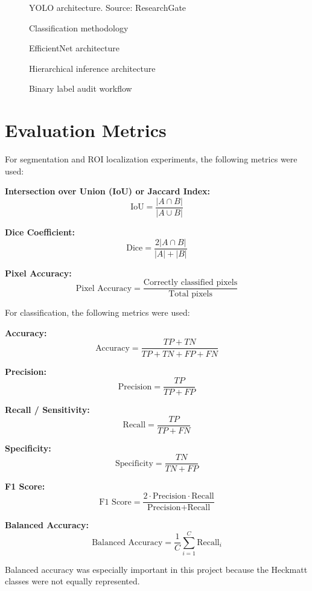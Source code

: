 \begin{figure}[H]
\centering
{}
\caption{YOLO architecture. Source: ResearchGate}
\label{fig:yolo_arch}
\end{figure}

\begin{figure}[H]
\centering
{}
\caption{Classification methodology}
\label{fig:classification_methodology}
\end{figure}

\begin{figure}[H]
\centering
{}
\caption{EfficientNet architecture}
\label{fig:efficientnet_arch}
\end{figure}


\begin{figure}[H]
\centering
{}
\caption{Hierarchical inference architecture}
\label{fig:hierarchical_arch}
\end{figure}

\begin{figure}[H]
\centering
{}
\caption{Binary label audit workflow}
\label{fig:audit_arch}
\end{figure}

\section{Evaluation Metrics}
\label{metrics}
For segmentation and ROI localization experiments, the following metrics were used:

\textbf{Intersection over Union (IoU) or Jaccard Index:}
\[
\text{IoU} = \frac{|A \cap B|}{|A \cup B|}
\]

\textbf{Dice Coefficient:}
\[
\text{Dice} = \frac{2|A \cap B|}{|A| + |B|}
\]

\textbf{Pixel Accuracy:}
\[
\text{Pixel Accuracy} = \frac{\text{Correctly classified pixels}}{\text{Total pixels}}
\]

For classification, the following metrics were used:

\textbf{Accuracy:}
\[
\text{Accuracy} = \frac{TP + TN}{TP + TN + FP + FN}
\]

\textbf{Precision:}
\[
\text{Precision} = \frac{TP}{TP + FP}
\]

\textbf{Recall / Sensitivity:}
\[
\text{Recall} = \frac{TP}{TP + FN}
\]

\textbf{Specificity:}
\[
\text{Specificity} = \frac{TN}{TN + FP}
\]

\textbf{F1 Score:}
\[
\text{F1 Score} = \frac{2 \cdot \text{Precision} \cdot \text{Recall}}{\text{Precision} + \text{Recall}}
\]

\textbf{Balanced Accuracy:}
\[
\text{Balanced Accuracy} = \frac{1}{C}\sum_{i=1}^{C}\text{Recall}_{i}
\]

Balanced accuracy was especially important in this project because the Heckmatt classes were not equally represented.

